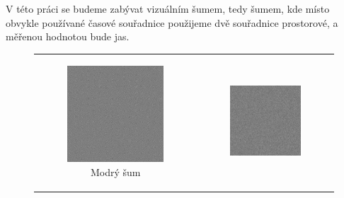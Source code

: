 V této práci se budeme zabývat vizuálním šumem, tedy šumem, kde místo obvykle
používané časové souřadnice použijeme dvě souřadnice prostorové, a měřenou
hodnotou bude jas. 

\begin{figure}[h!]
\begin{tabular}{cc}
\begin{subfigure}{0.45\textwidth}
  \centering
  \includegraphics[width=.8\linewidth]{img/blue_noise}
  \caption{Modrý šum} 
\end{subfigure}&
\begin{subfigure}{0.45\textwidth}
  \centering
  \includegraphics[width=.8\linewidth]{img/white_noise}

\end{subfigure}
\end{tabular}
\end{figure}

